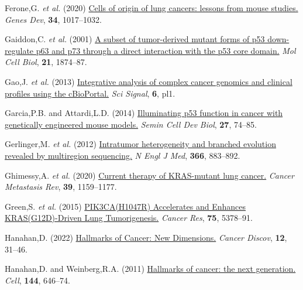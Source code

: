 \begin{CSLReferences}{1}{0}
\leavevmode{}%
Ferone,G. \emph{et al.} (2020) \href{https://doi.org/10.1101/gad.338228.120}{Cells of origin of lung cancers: lessons from mouse studies.} \emph{Genes Dev}, \textbf{34}, 1017--1032.

\leavevmode{}%
Gaiddon,C. \emph{et al.} (2001) \href{https://doi.org/10.1128/mcb.21.5.1874-1887.2001}{A subset of tumor-derived mutant forms of p53 down-regulate p63 and p73 through a direct interaction with the p53 core domain.} \emph{Mol Cell Biol}, \textbf{21}, 1874--87.

\leavevmode{}%
Gao,J. \emph{et al.} (2013) \href{https://doi.org/10.1126/scisignal.2004088}{Integrative analysis of complex cancer genomics and clinical profiles using the cBioPortal.} \emph{Sci Signal}, \textbf{6}, pl1.

\leavevmode{}%
Garcia,P.B. and Attardi,L.D. (2014) \href{https://doi.org/10.1016/j.semcdb.2013.12.014}{Illuminating p53 function in cancer with genetically engineered mouse models.} \emph{Semin Cell Dev Biol}, \textbf{27}, 74--85.

\leavevmode{}%
Gerlinger,M. \emph{et al.} (2012) \href{https://doi.org/10.1056/nejmoa1113205}{Intratumor heterogeneity and branched evolution revealed by multiregion sequencing.} \emph{N Engl J Med}, \textbf{366}, 883--892.

\leavevmode{}%
Ghimessy,A. \emph{et al.} (2020) \href{https://doi.org/10.1007/s10555-020-09903-9}{Current therapy of KRAS-mutant lung cancer.} \emph{Cancer Metastasis Rev}, \textbf{39}, 1159--1177.

\leavevmode{}%
Green,S. \emph{et al.} (2015) \href{https://doi.org/10.1158/0008-5472.can-15-1249}{PIK3CA(H1047R) Accelerates and Enhances KRAS(G12D)-Driven Lung Tumorigenesis.} \emph{Cancer Res}, \textbf{75}, 5378--91.

\leavevmode{}%
Hanahan,D. (2022) \href{https://doi.org/10.1158/2159-8290.cd-21-1059}{Hallmarks of Cancer: New Dimensions.} \emph{Cancer Discov}, \textbf{12}, 31--46.

\leavevmode{}%
Hanahan,D. and Weinberg,R.A. (2011) \href{https://doi.org/10.1016/j.cell.2011.02.013}{Hallmarks of cancer: the next generation.} \emph{Cell}, \textbf{144}, 646--74.


\end{CSLReferences}
